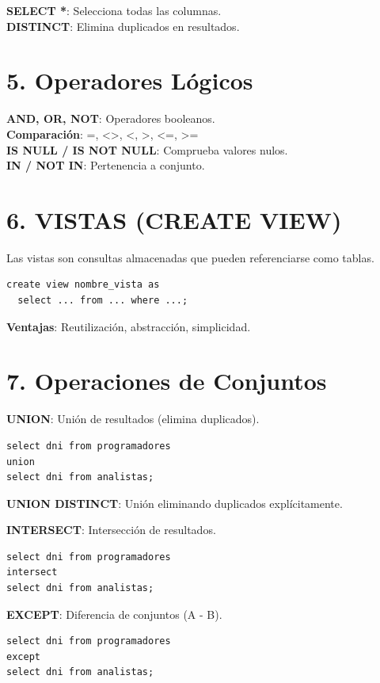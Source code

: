 \documentclass[10pt,a4paper,twocolumn]{article}
\begin{document}
\textbf{SELECT *}: Selecciona todas las columnas.\\
\textbf{DISTINCT}: Elimina duplicados en resultados.

\section*{5. Operadores Lógicos}

\textbf{AND, OR, NOT}: Operadores booleanos.\\
\textbf{Comparación}: =, <>, <, >, <=, >=\\
\textbf{IS NULL / IS NOT NULL}: Comprueba valores nulos.\\
\textbf{IN / NOT IN}: Pertenencia a conjunto.

\section*{6. VISTAS (CREATE VIEW)}

Las vistas son consultas almacenadas que pueden referenciarse como tablas.

\begin{lstlisting}
create view nombre_vista as
  select ... from ... where ...;
\end{lstlisting}

\textbf{Ventajas}: Reutilización, abstracción, simplicidad.

\section*{7. Operaciones de Conjuntos}

\textbf{UNION}: Unión de resultados (elimina duplicados).
\begin{lstlisting}
select dni from programadores
union
select dni from analistas;
\end{lstlisting}

\textbf{UNION DISTINCT}: Unión eliminando duplicados explícitamente.

\textbf{INTERSECT}: Intersección de resultados.
\begin{lstlisting}
select dni from programadores
intersect
select dni from analistas;
\end{lstlisting}

\textbf{EXCEPT}: Diferencia de conjuntos (A - B).
\begin{lstlisting}
select dni from programadores
except
select dni from analistas;
\end{lstlisting}
\end{document}
